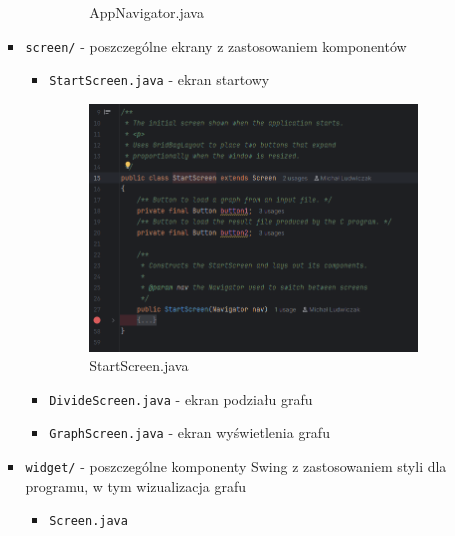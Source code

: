 \documentclass{article}
\begin{document}
\begin{itemize}
\begin{itemize}
\begin{itemize}
\begin{itemize}
\begin{figure}[H]
                                        \caption{AppNavigator.java}
                                        \label{fig:appnavigator}
                                 \end{figure}
                            \end{itemize}
                        \item \texttt{screen/} - poszczególne ekrany z zastosowaniem komponentów
                            \begin{itemize}
                                 \item \texttt{StartScreen.java} - ekran startowy
                                 \begin{figure}[H]
                                        \centering
                                        \includegraphics[width=0.9\linewidth]{img/startscreen.png}
                                        \caption{StartScreen.java}
                                        \label{fig:startscreen}
                                 \end{figure}
                                 \item \texttt{DivideScreen.java} - ekran podziału grafu
                                 \item \texttt{GraphScreen.java} - ekran wyświetlenia grafu
                            \end{itemize}
                        \item \texttt{widget/} - poszczególne komponenty Swing z zastosowaniem styli dla programu, w tym wizualizacja grafu
                            \begin{itemize}
                                 \item \texttt{Screen.java}

\end{itemize}
\end{itemize}
\end{itemize}
\end{itemize}
\end{document}
